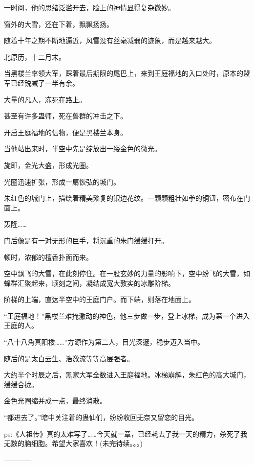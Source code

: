 \begin{this_body}
一时间，他的思绪泛滥开去，脸上的神情显得复杂微妙。

窗外的大雪，还在下着，飘飘扬扬。

随着十年之期不断地逼近，风雪没有丝毫减弱的迹象，而是越来越大。

北原历，十二月末。

当黑楼兰率领大军，踩着最后期限的尾巴上，来到王庭福地的入口处时，原本的盟军已经锐减了一半有余。

大量的凡人，冻死在路上。

甚至有许多蛊师，死在兽群的冲击之下。

开启王庭福地的信物，便是黑楼兰本身。

当他站出来时，半空中先是绽放出一缕金色的微光。

旋即，金光大盛，形成光圈。

光圈迅速扩张，形成一扇恢弘的城门。

朱红色的城门上，描绘着精美繁复的银边花纹。一颗颗粗壮如拳的铜钮，密布在门面上。

轰隆……

门后像是有一对无形的巨手，将沉重的朱门缓缓打开。

顿时，浓郁的檀香扑面而来。

空中飘飞的大雪，在此刻停住。在一股玄妙的力量的影响下，空中纷飞的大雪，如蜂群汇聚起来，顷刻之间，凝结成宽大敦实的冰雕阶梯。

阶梯的上端，直达半空中的王庭门户。而下端，则落在地面上。

“王庭福地！”黑楼兰难掩激动的神色，他三步做一步，登上冰梯，成为第一个进入王庭的人。

“八十八角真阳楼……”方源作为第二人，目光深邃，稳步迈入当中。

随后的是太白云生、浩激流等等高层强者。

大约半个时辰之后，黑家大军全数进入王庭福地。冰梯崩解，朱红色的高大城门，缓缓合拢。

金色光圈缩并成一点，最终消散。

“都进去了。”暗中关注着的蛊仙们，纷纷收回无奈又留恋的目光。

ps:《人祖传》真的太难写了……今天就一章，已经耗去了我一天的精力，杀死了我无数的脑细胞。希望大家喜欢！(未完待续。。。)

------------

\end{this_body}

